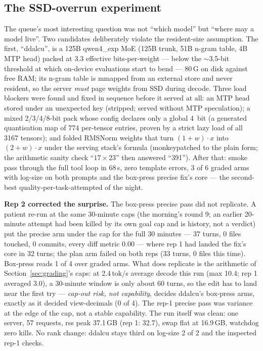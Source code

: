 \subsection{The SSD-overrun experiment}\label{sec:ssd}

The queue's most interesting question was not ``which model'' but ``where may a model live''. Two candidates
deliberately violate the resident-size assumption. The first, ``ddalcu'', is a 125B qwen4\_exp MoE (125B trunk,
51B n-gram table, 4B MTP head) packed at 3.3 effective bits-per-weight --- below the ${\sim}$3.5-bit threshold at
which on-device evaluations start to bend \citep{Song-2025aa} --- 80\,G on disk against free RAM; its n-gram table
is mmapped from an external store and never resident, so the server \emph{must} page weights from SSD during
decode. Three load blockers were found and fixed in sequence before it served at all: an MTP head stored under an
unexpected key (stripped; served without MTP speculation); a mixed 2/3/4/8-bit pack whose config declares only a
global 4~bit (a generated quantisation map of 774 per-tensor entries, proven by a strict lazy load of all 3167
tensors); and folded RMSNorm weights that turn $(1+w)\cdot x$ into $(2+w)\cdot x$ under the serving stack's
formula (monkeypatched to the plain form; the arithmetic sanity check ``$17\times23$'' then answered ``391'').
After that: smoke pass through the full tool loop in 68\,s, zero template errors, 3 of 6 graded arms with
log-size on both prompts and the box-press precise fix's core --- the second-best quality-per-task-attempted of
the night.

\textbf{Rep 2 corrected the surprise.} The box-press precise pass did not replicate. A patient re-run at the
same 30-minute caps (the morning's round 9; an earlier 20-minute attempt had been killed by its own goal cap
and is history, not a verdict) put the precise arm under the cap for the full 30 minutes --- 37 turns, 0 files
touched, 0 commits, every diff metric 0.00 --- where rep 1 had landed the fix's core in 32 turns; the plan arm
failed on both reps (33 turns, 0 files this time). Box-press reads 1 of 4 over graded arms. What does
replicate is the arithmetic of Section~\ref{sec:grading}'s caps: at 2.4\,tok/s average decode this run (max
10.4; rep 1 averaged 3.0), a 30-minute window is only about 60 turns, so the edit has to land near the first
try --- \emph{cap-out risk, not capability}, decides ddalcu's box-press arms, exactly as it decided
view-decimals (0 of 4). The rep-1 precise pass was variance at the edge of the cap, not a stable capability.
The run itself was clean: one server, 57 requests, rss peak 37.1\,GB (rep 1: 32.7), swap flat at 16.9\,GB,
watchdog zero kills. No rank change: ddalcu stays third on log-size 2 of 2 and the inspected rep-1 checks.

